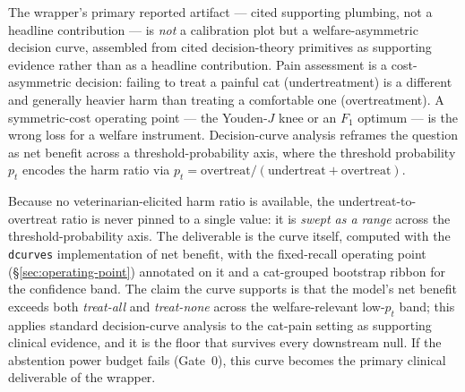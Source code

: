 The wrapper's primary reported artifact --- cited supporting plumbing, not a
headline contribution --- is \emph{not} a calibration plot but a
welfare-asymmetric decision curve, assembled from cited decision-theory
primitives as supporting evidence rather than as a headline contribution. Pain
assessment is a cost-asymmetric
decision: failing to treat a painful cat (undertreatment) is a different and
generally heavier harm than treating a comfortable one (overtreatment). A
symmetric-cost operating point --- the Youden-$J$ knee or an $F_1$ optimum ---
is the wrong loss for a welfare instrument. Decision-curve analysis
\cite{vickers2006dca} reframes the question as net benefit across a
threshold-probability axis, where the threshold probability $p_t$ encodes the
harm ratio via $p_t = \text{overtreat} / (\text{undertreat} + \text{overtreat})$.

Because no veterinarian-elicited harm ratio is available, the undertreat-to-overtreat
ratio is never pinned to a single value: it is \emph{swept as a range} across
the threshold-probability axis. The deliverable is the curve itself, computed
with the \texttt{dcurves} implementation of net benefit, with the fixed-recall
operating point (\S\ref{sec:operating-point}) annotated on it and a
cat-grouped bootstrap ribbon for the confidence band. The claim the curve
supports is that the model's net benefit exceeds both \emph{treat-all} and
\emph{treat-none} across the welfare-relevant low-$p_t$ band; this applies
standard decision-curve analysis to the cat-pain setting as supporting clinical
evidence, and it is the floor that survives every downstream null. If the
abstention power budget fails (Gate~0), this curve becomes the primary clinical
deliverable of the wrapper.

